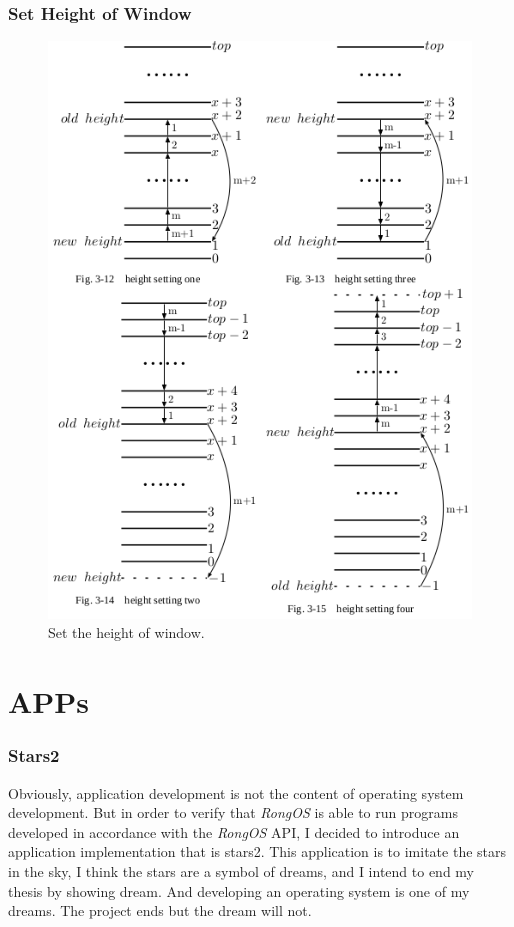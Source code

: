 \documentclass{beamer}
\begin{document}
\begin{frame}
  \frametitle{Set Height of Window}
  \begin{figure}
    \includegraphics[scale=0.3]{four.png}
    \caption{Set the height of window.}
\end{figure}
  
  
\end{frame}


\section{APPs}

\begin{frame}
  \frametitle{Stars2}
  Obviously, application development is not the content of operating system development.
  But in order to verify that \emph{RongOS} is able to run programs developed in accordance with
  the \emph{RongOS} API, I decided to introduce an application implementation that is
  stars2. This application is to imitate the stars in the sky, I think the stars are a
  symbol of dreams, and I intend to end my thesis by showing dream. And developing an
  operating system is one of my dreams. The project ends but the dream will not.
\end{frame}
\end{document}
